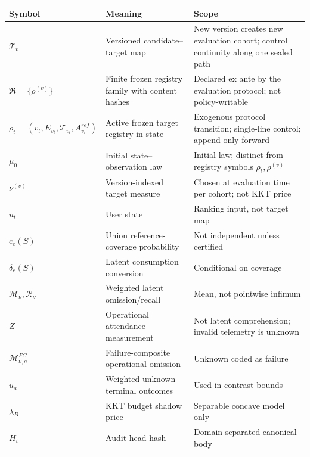 \documentclass[
  11pt]{article}
\begin{document}
\begin{longtable}[]{@{}
  >{\raggedright\arraybackslash}p{}
  >{\raggedright\arraybackslash}p{}
  >{\raggedright\arraybackslash}p{}@{}}
\toprule\noalign{}
\begin{minipage}[b]{\linewidth}\raggedright
Symbol
\end{minipage} & \begin{minipage}[b]{\linewidth}\raggedright
Meaning
\end{minipage} & \begin{minipage}[b]{\linewidth}\raggedright
Scope
\end{minipage} \\
\midrule\noalign{}
\endhead
\bottomrule\noalign{}
\endlastfoot
\(\mathcal T_v\) & Versioned candidate--target map & New version creates
new evaluation cohort; control continuity along one sealed path \\
\(\mathfrak R=\{\rho^{(v)}\}\) & Finite frozen registry family with
content hashes & Declared ex ante by the evaluation protocol; not
policy-writable \\
\(\rho_t=(v_t,E_{v_t},\mathcal T_{v_t},A^{ref}_{v_t})\) & Active frozen
target registry in state & Exogenous protocol transition; single-line
control; append-only forward \\
\(\mu_0\) & Initial state--observation law & Initial law; distinct from
registry symbols \(\rho_t,\rho^{(v)}\) \\
\(\nu^{(v)}\) & Version-indexed target measure & Chosen at evaluation
time per cohort; not KKT price \\
\(u_t\) & User state & Ranking input, not target map \\
\(c_e(S)\) & Union reference-coverage probability & Not independent
unless certified \\
\(\delta_e(S)\) & Latent consumption conversion & Conditional on
coverage \\
\(\mathcal M_\nu,\mathcal R_\nu\) & Weighted latent omission/recall &
Mean, not pointwise infimum \\
\(Z\) & Operational attendance measurement & Not latent comprehension;
invalid telemetry is unknown \\
\(\mathcal M^{FC}_{\nu,a}\) & Failure-composite operational omission &
Unknown coded as failure \\
\(u_a\) & Weighted unknown terminal outcomes & Used in contrast
bounds \\
\(\lambda_B\) & KKT budget shadow price & Separable concave model
only \\
\(H_t\) & Audit head hash & Domain-separated canonical body \\
\end{longtable}
\end{document}
